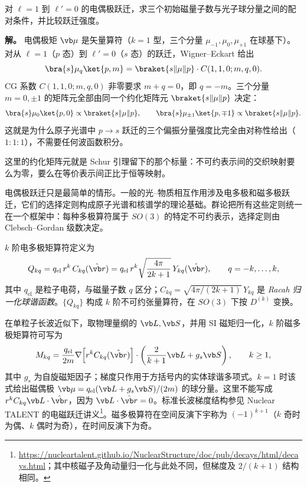 \begin{example}
对 $\ell=1$ 到 $\ell\prime=0$ 的电偶极跃迁，求三个初始磁量子数与光子球分量之间的配对条件，并比较跃迁强度。

\textbf{解。} 电偶极矩 $\vb\mu$ 是矢量算符（$k=1$ 型，三个分量 $\mu_{-1},\mu_0,\mu_{+1}$ 在球基下）。对从 $\ell=1$（$p$ 态）到 $\ell'=0$（$s$ 态）的跃迁，Wigner--Eckart 给出
\[
\bra{s}\mu_q\ket{p,m}
=\braket{s\|\mu\|p}\cdot C(1,1,0;m,q,0).
\]
CG 系数 $C(1,1,0;m,q,0)$ 非零要求 $m+q=0$，即 $q=-m$。三个分量 $m=0,\pm1$ 的矩阵元全部由同一个约化矩阵元 $\braket{s\|\mu\|p}$ 决定：
\[
\bra{s}\mu_0\ket{p,0}\propto\braket{s\|\mu\|p},
\qquad
\bra{s}\mu_{\pm1}\ket{p,\mp1}\propto\braket{s\|\mu\|p}.
\]
这就是为什么原子光谱中 $p\to s$ 跃迁的三个偏振分量强度比完全由对称性给出（$1:1:1$），不需要任何波函数积分。
\end{example}

这里的约化矩阵元就是 Schur 引理留下的那个标量：不可约表示间的交织映射要么为零，要么在等价表示间正比于恒等映射。

电偶极跃迁只是最简单的情形。一般的光--物质相互作用涉及电多极和磁多极跃迁，它们的选择定则构成原子光谱和核谱学的理论基础。群论把所有这些定则统一在一个框架中：每种多极算符属于 $SO(3)$ 的特定不可约表示，选择定则由 Clebsch--Gordan 级数决定。

\begin{definition}[电多极与磁多极算符]
$k$ 阶电多极矩算符定义为
\begin{equation}
Q_{kq}=q_{\mathrm{el}}\,r^k\,C_{kq}(\hat{\vb r})
=q_{\mathrm{el}}\,r^k\sqrt{\frac{4\pi}{2k+1}}\,Y_{kq}(\hat{\vb r}),
\qquad q=-k,\dots,k,
\label{eq:electric-multipole}
\end{equation}
其中 $q_{\mathrm{el}}$ 是粒子电荷，与磁量子数 $q$ 区分；$C_{kq}=\sqrt{4\pi/(2k+1)}\,Y_{kq}$ 是 \emph{Racah 归一化球谐函数}。$\{Q_{kq}\}$ 构成 $k$ 阶不可约张量算符，在 $SO(3)$ 下按 $D^{(k)}$ 变换。

在单粒子长波近似下，取物理量纲的 $\vb L,\vb S$，并用 SI 磁矩归一化，$k$ 阶磁多极矩算符可写为
\begin{equation}
M_{kq}=\frac{q_{\mathrm{el}}}{2m}
\nabla\!\left[r^k C_{kq}(\hat{\vb r})\right]\cdot
\left(\frac{2}{k+1}\vb L+g_s\vb S\right),\qquad k\ge1,
\label{eq:magnetic-multipole}
\end{equation}
其中 $g_s$ 为自旋磁矩因子；梯度只作用于方括号内的实体球谐多项式。$k=1$ 时该式给出磁偶极 $\vb\mu=q_{\mathrm{el}}(\vb L+g_s\vb S)/(2m)$ 的球分量。这里不能写成 $r^kC_{kq}\vb L\cdot\hat{\vb r}$，因为 $\vb L\cdot\hat{\vb r}=0$。标准长波梯度结构参见 Nuclear TALENT 的电磁跃迁讲义\footnote{\url{https://nucleartalent.github.io/NuclearStructure/doc/pub/decays/html/decays.html}；其中核磁子及角动量归一化与此处不同，但梯度及 $2/(k+1)$ 结构相同。}。磁多极算符在空间反演下宇称为 $(-1)^{k+1}$（$k$ 奇时为偶、$k$ 偶时为奇），在时间反演下为奇。
\label{def:multipole-operators}
\end{definition}

